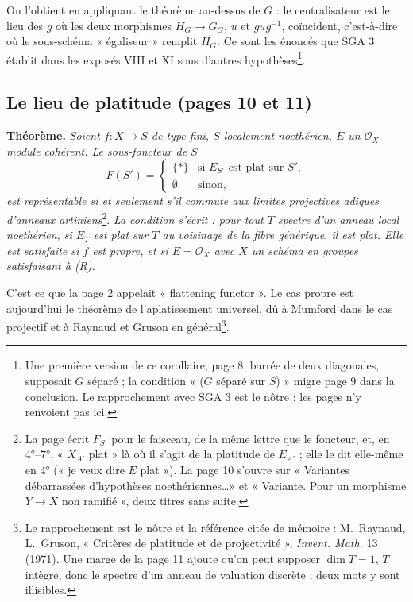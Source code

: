 \documentclass[11pt,a4paper]{article}
\begin{document}
On l'obtient en appliquant le théorème au-dessus de $G$ : le centralisateur
est le lieu des $g$ où les deux morphismes $H_G \to G_G$, $u$ et $g u
g^{-1}$, coïncident, c'est-à-dire où le sous-schéma « égaliseur » remplit
$H_G$. Ce sont les énoncés que SGA 3 établit dans les exposés VIII et XI
sous d'autres hypothèses\footnote{Une première version de ce corollaire,
page 8, barrée de deux diagonales, supposait $G$ séparé ; la condition
« ($G$ séparé sur $S$) » migre page 9 dans la conclusion. Le rapprochement
avec SGA 3 est le nôtre ; les pages n'y renvoient pas ici.}.

\subsection*{Le lieu de platitude (pages 10 et 11)}

\textbf{Théorème.} \emph{Soient $f : X \to S$ de type fini, $S$ localement
noethérien, $E$ un $\mathcal{O}_X$-module cohérent. Le sous-foncteur de $S$
\[
  F(S') = \begin{cases} \{\ast\} & \text{si } E_{S'} \text{ est plat sur } S',\\
  \emptyset & \text{sinon,}\end{cases}
\]
est représentable si et seulement s'il commute aux limites projectives
adiques d'anneaux artiniens}\footnote{La page écrit $F_{S'}$ pour le faisceau,
de la même lettre que le foncteur, et, en 4°--7°, « $X_{A'}$ plat » là où il
s'agit de la platitude de $E_{A'}$ ; elle le dit elle-même en 4° (« je veux
dire $E$ plat »). La page 10 s'ouvre sur « Variantes débarrassées
d'hypothèses noethériennes\ldots » et « Variante. Pour un morphisme $Y \to X$
non ramifié », deux titres sans suite.}. \emph{La condition s'écrit : pour tout
$T$ spectre d'un anneau local noethérien, si $E_T$ est plat sur $T$ au
voisinage de la fibre générique, il est plat. Elle est satisfaite si $f$ est
propre, et si $E = \mathcal{O}_X$ avec $X$ un schéma en groupes satisfaisant à
(R).}

C'est ce que la page 2 appelait « flattening functor ». Le cas propre est
aujourd'hui le théorème de l'aplatissement universel, dû à Mumford dans le
cas projectif et à Raynaud et Gruson en général\footnote{Le rapprochement est
le nôtre et la référence citée de mémoire : M.~Raynaud, L.~Gruson, « Critères
de platitude et de projectivité », \emph{Invent. Math.} 13 (1971). Une marge
de la page 11 ajoute qu'on peut supposer $\dim T = 1$, $T$ intègre, donc le
spectre d'un anneau de valuation discrète ; deux mots y sont illisibles.}.
\end{document}
